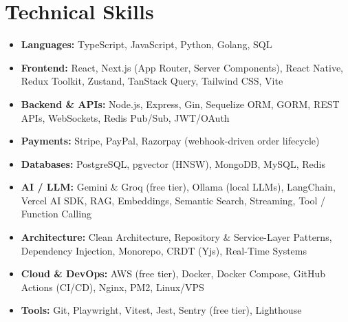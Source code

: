 \documentclass[a4paper,10pt]{article}
\begin{document}
\section{Technical Skills}
\begin{itemize}[label={},leftmargin=0pt,itemsep=2pt]
  \item \textbf{Languages:} TypeScript, JavaScript, Python, Golang, SQL
  \item \textbf{Frontend:} React, Next.js (App Router, Server Components), React Native, Redux Toolkit, Zustand, TanStack Query, Tailwind CSS, Vite
  \item \textbf{Backend \& APIs:} Node.js, Express, Gin, Sequelize ORM, GORM, REST APIs, WebSockets, Redis Pub/Sub, JWT/OAuth
  \item \textbf{Payments:} Stripe, PayPal, Razorpay (webhook-driven order lifecycle)
  \item \textbf{Databases:} PostgreSQL, pgvector (HNSW), MongoDB, MySQL, Redis
  \item \textbf{AI / LLM:} Gemini \& Groq (free tier), Ollama (local LLMs), LangChain, Vercel AI SDK, RAG, Embeddings, Semantic Search, Streaming, Tool / Function Calling
  \item \textbf{Architecture:} Clean Architecture, Repository \& Service-Layer Patterns, Dependency Injection, Monorepo, CRDT (Yjs), Real-Time Systems
  \item \textbf{Cloud \& DevOps:} AWS (free tier), Docker, Docker Compose, GitHub Actions (CI/CD), Nginx, PM2, Linux/VPS
  \item \textbf{Tools:} Git, Playwright, Vitest, Jest, Sentry (free tier), Lighthouse
\end{itemize}

\end{document}

